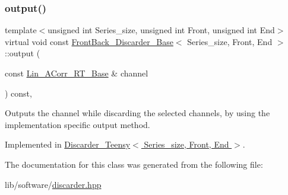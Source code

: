 \subsubsection{\texorpdfstring{output()}{output()}}
{\footnotesize\ttfamily template$<$unsigned int Series\+\_\+size, unsigned int Front, unsigned int End$>$ \\
virtual void const \hyperlink{classFrontBack__Discarder__Base}{Front\+Back\+\_\+\+Discarder\+\_\+\+Base}$<$ Series\+\_\+size, Front, End $>$\+::output (\begin{DoxyParamCaption}\item[{const \hyperlink{classLin__ACorr__RT__Base}{Lin\+\_\+\+A\+Corr\+\_\+\+R\+T\+\_\+\+Base} \&}]{channel }\end{DoxyParamCaption}) const\hspace{0.3cm}{\ttfamily [inline]}, {}}



Outputs the channel while discarding the selected channels, by using the implementation specific output method. 



Implemented in \hyperlink{classDiscarder__Teensy_a4edb6d02ac299d4c578a4c8522f0dffd}{Discarder\+\_\+\+Teensy$<$ Series\+\_\+size, Front, End $>$}.



The documentation for this class was generated from the following file\+:\begin{DoxyCompactItemize}
\item 
lib/software/\hyperlink{discarder_8hpp}{discarder.\+hpp}\end{DoxyCompactItemize}
